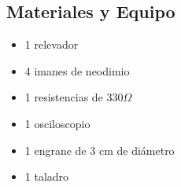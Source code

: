 \subsection{Materiales y Equipo}
\begin{multicols}{2}
\begin{itemize}
 \item 1 relevador
 \item 4 imanes de neodimio
 \item 1 resistencias de $330 \Omega$
 \item 1 osciloscopio
 \item 1 engrane de 3 cm de di\'ametro
 \item 1 taladro
\end{itemize}
\end{multicols}
